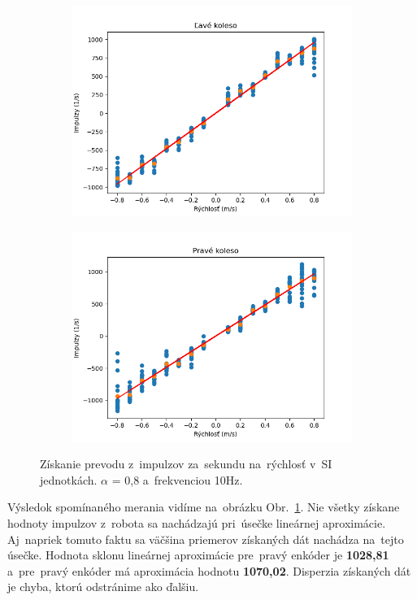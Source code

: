 \clearpage

\begin{figure}[!htbp]
	\begin{subfigure}{0.5\textwidth}
		\includegraphics[width=\textwidth]{img/lw_08100.png}
	\end{subfigure}
	\hfill
	\begin{subfigure}{0.5\textwidth}
		\includegraphics[width=\textwidth]{img/rw_08100.png}
	\end{subfigure}
	\caption{Získanie prevodu z~impulzov za~sekundu na~rýchlosť v~SI jednotkách. $\alpha$ = 0,8 a~frekvenciou 10Hz.}
	\label{fig:rw_lw_08100}
\end{figure}

Výsledok spomínaného merania vidíme na~obrázku Obr.~\ref{fig:rw_lw_08100}. Nie všetky získane hodnoty impulzov
z~robota sa nachádzajú pri~úsečke lineárnej aproximácie. Aj~napriek tomuto faktu sa väčšina priemerov získaných
dát nachádza na~tejto úsečke. Hodnota sklonu lineárnej aproximácie pre~pravý enkóder je \textbf{1028,81} a~pre~pravý
enkóder má aproximácia hodnotu \textbf{1070,02}. Disperzia získaných dát je chyba, ktorú odstránime ako ďalšiu.

